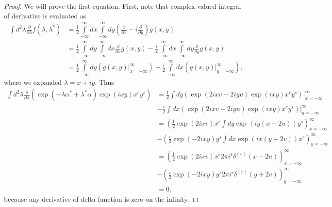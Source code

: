 \begin{proof}
We will prove the first equation.
First, note that complex-valued integral of derivative is evaluated as
\begin{equation*}
\begin{split}
	\int d^2\lambda \frac{\partial}{\partial \lambda} f(\lambda, \lambda^*)
	& = \frac{1}{2} \int\limits_{-\infty}^{\infty} dx \int\limits_{-\infty}^{\infty} dy
		\left( \frac{\partial}{\partial x} - i \frac{\partial}{\partial y} \right)
		g(x, y) \\
	& = \frac{1}{2} \int\limits_{-\infty}^{\infty} dy \int\limits_{-\infty}^{\infty} dx
			\frac{\partial}{\partial x} g(x, y)
		- \frac{i}{2} \int\limits_{-\infty}^{\infty} dx \int\limits_{-\infty}^{\infty} dy
			\frac{\partial}{\partial y} g(x, y) \\
	& =	\frac{1}{2} \int\limits_{-\infty}^{\infty} dy \left(
			\left. g(x, y) \right|_{x=-\infty}^{\infty}
		\right)
		- \frac{i}{2} \int\limits_{-\infty}^{\infty} dx \left(
			\left. g(x, y) \right|_{y=-\infty}^{\infty}
		\right),
\end{split}
\end{equation*}
where we expanded $\lambda = x + iy$.
Thus
\begin{equation*}
\begin{split}
	\int d^2\lambda
		\frac{\partial}{\partial \lambda} \left(
			\exp(-\lambda \alpha^* + \lambda^* \alpha)
			\exp(ixy) x^r y^s
		\right)
	& = \frac{1}{2} \int dy \left. \left(
			\exp(2ixv - 2iyu) \exp(ixy) x^r y^s
		\right) \right|_{x = -\infty}^\infty \\
	& - \frac{i}{2} \int dx \left. \left(
			\exp(2ixv - 2iyu) \exp(ixy) x^r y^s
		\right) \right|_{y = -\infty}^\infty \\
	& = \left(
			\frac{1}{2} \exp(2ixv) x^r \int dy \exp(iy(x-2u)) y^s
		\right)_{x = -\infty}^\infty \\
	& - \left(
			\frac{i}{2} \exp(-2ixy) y^s \int dx \exp(ix(y+2v)) x^r
		\right)_{y = -\infty}^\infty \\
	& = \left(
			\frac{1}{2} \exp(2ixv) x^r 2 \pi i^s \delta^{(s)}(x-2u)
		\right)_{x = -\infty}^\infty \\
	& - \left(
			\frac{i}{2} \exp(-2ixy) y^s 2 \pi i^r \delta^{(r)}(y+2v)
		\right)_{y = -\infty}^\infty \\
	& = 0,
\end{split}
\end{equation*}
because any derivative of delta function is zero on the infinity.
\end{proof}
